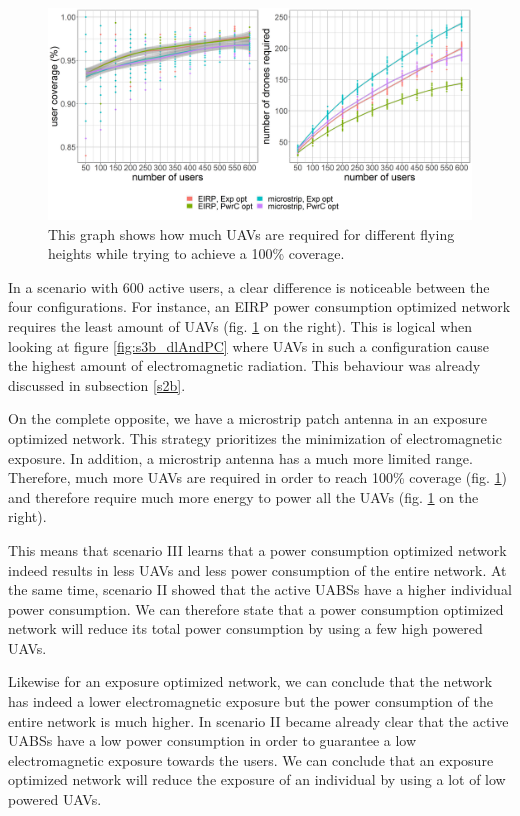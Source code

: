 \begin{figure}[h!]
  \includegraphics[width=\textwidth]{../results/s3/uvsnumdronesAndCov.png}
  \caption{This graph shows how much \gls{UAV}s are required for different flying heights while trying to achieve a 100\% coverage.}
  \label{fig:s3b_numdronesAndCov}
\end{figure}

In a scenario with 600 active users, a clear difference is noticeable between the four configurations. 
For instance, an EIRP power consumption optimized 
network requires the least amount of \gls{UAV}s (fig. \ref{fig:s3b_numdronesAndCov} on the right). This is logical when looking at figure \ref{fig:s3b_dlAndPC} where \gls{UAV}s in such a configuration cause 
the highest amount of 
electromagnetic radiation. This behaviour was already discussed in subsection \ref{s2b}. 

On the complete opposite, we have a microstrip patch antenna in an exposure optimized network. 
This strategy prioritizes the minimization of electromagnetic exposure. In addition, a microstrip antenna has a much more limited range.
Therefore, much more 
\gls{UAV}s are required in order to reach 100\% coverage (fig. \ref{fig:s3b_numdronesAndCov}) and therefore require much more energy 
to power all the \gls{UAV}s (fig. \ref{fig:s3b_numdronesAndCov} on the right).

This means that scenario III learns that a power consumption optimized network indeed results in less \gls{UAV}s and less 
 power consumption of the entire network. 
At the same time, scenario II showed that the active \gls{UABS}s have a higher individual power consumption.
We can therefore state that a power consumption optimized network will reduce its total power consumption by
using a few high powered \gls{UAV}s.

Likewise for an exposure optimized network, we can conclude that the network has indeed a lower electromagnetic exposure but the power consumption 
of the entire network is much higher. In scenario II became already clear that the active \gls{UABS}s have a low power consumption in order to 
guarantee a low electromagnetic exposure towards the users.
We can conclude that an exposure optimized network will reduce the exposure of an individual by 
using a lot of low powered \gls{UAV}s.

